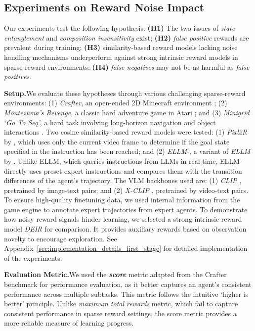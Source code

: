 \documentclass{article}
\theoremstyle{plain}
\theoremstyle{definition}
\theoremstyle{remark}
\begin{document}
\subsection{Experiments on Reward Noise Impact}
\label{sec:experiments_on_existence}
Our experiments test the following hypothesis: \textbf{(H1)} The two issues of \emph{state entanglement} and \emph{composition insensitivity} exist; \textbf{(H2)} \emph{false positive} rewards are prevalent during training; \textbf{(H3)} similarity-based reward models lacking noise handling mechanisms underperform against strong intrinsic reward models in sparse reward environments; \textbf{(H4)} \emph{false negatives} may not be as harmful as \emph{false positives}.

\noindent \textbf{Setup.}\quad We evaluate these hypotheses through various challenging sparse-reward environments: (1) \emph{Crafter}, an open-ended 2D Minecraft environment \citep{Hafner2021BenchmarkingTS}; (2) \emph{Montezuma's Revenge}, a classic hard adventure game in Atari \citep{Bellemare2012TheAL}; and (3) \emph{Minigrid `Go To Seq'}, a hard task involving long-horizon navigation and object interactions \citep{chevalier2018babyai}. Two cosine similarity-based reward models were tested: (1) \emph{Pixl2R} by \citet{Goyal2020PixL2RGR}, which uses only the current video frame to determine if the goal state specified in the instruction has been reached; and (2) \emph{ELLM-}, a variant of \emph{ELLM} by \citet{du2023guiding}. Unlike ELLM, which queries instructions from LLMs in real-time, ELLM- directly uses preset expert instructions and compares them with the transition differences of the agent's trajectory. The VLM backbones used are: (1) \emph{CLIP} \citep{Radford2021LearningTV}, pretrained by image-text pairs; and (2) \emph{X-CLIP} \citep{Ma2022XCLIPEM}, pretrained by video-text pairs. To ensure high-quality finetuning data, we used internal information from the game engine to annotate expert trajectories from expert agents. To demonstrate how noisy reward signals hinder learning, we selected a strong intrinsic reward model \emph{DEIR} \citep{Zhang2021NovelDAS} for comparison. It provides auxiliary rewards based on observation novelty to encourage exploration. See Appendix~\ref{sec:implementation_details_first_stage} for detailed implementation of the experiments.

\noindent \textbf{Evaluation Metric.}\quad We used the \textbf{\emph{score}} metric adapted from the Crafter benchmark \citep{Hafner2021BenchmarkingTS} for performance evaluation, as it better captures an agent's consistent performance across multiple subtasks. This metric follows the intuitive `higher is better' principle. Unlike \emph{maximum total rewards} metric, which fail to capture consistent performance in sparse reward settings, the score metric provides a more reliable measure of learning progress.
\end{document}
